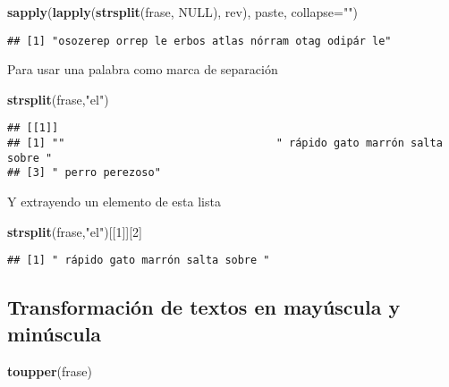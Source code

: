 \documentclass[]{article}
\newenvironment{Shaded}{\begin{snugshade}}{\end{snugshade}}
\newcommand{\KeywordTok}[1]{\textcolor[rgb]{0.13,0.29,0.53}{\textbf{#1}}}
\newcommand{\DataTypeTok}[1]{\textcolor[rgb]{0.13,0.29,0.53}{#1}}
\newcommand{\DecValTok}[1]{\textcolor[rgb]{0.00,0.00,0.81}{#1}}
\newcommand{\StringTok}[1]{\textcolor[rgb]{0.31,0.60,0.02}{#1}}
\newcommand{\OtherTok}[1]{\textcolor[rgb]{0.56,0.35,0.01}{#1}}
\newcommand{\NormalTok}[1]{#1}
\begin{document}
\begin{Shaded}
\begin{Highlighting}[]
\KeywordTok{sapply}\NormalTok{(}\KeywordTok{lapply}\NormalTok{(}\KeywordTok{strsplit}\NormalTok{(frase, }\OtherTok{NULL}\NormalTok{), rev), paste, }\DataTypeTok{collapse=}\StringTok{""}\NormalTok{)}
\end{Highlighting}
\end{Shaded}

\begin{verbatim}
## [1] "osozerep orrep le erbos atlas nórram otag odipár le"
\end{verbatim}

Para usar una palabra como marca de separación

\begin{Shaded}
\begin{Highlighting}[]
\KeywordTok{strsplit}\NormalTok{(frase,}\StringTok{"el"}\NormalTok{)}
\end{Highlighting}
\end{Shaded}

\begin{verbatim}
## [[1]]
## [1] ""                                 " rápido gato marrón salta sobre "
## [3] " perro perezoso"
\end{verbatim}

Y extrayendo un elemento de esta lista

\begin{Shaded}
\begin{Highlighting}[]
\KeywordTok{strsplit}\NormalTok{(frase,}\StringTok{"el"}\NormalTok{)[[}\DecValTok{1}\NormalTok{]][}\DecValTok{2}\NormalTok{]}
\end{Highlighting}
\end{Shaded}

\begin{verbatim}
## [1] " rápido gato marrón salta sobre "
\end{verbatim}

\subsection{Transformación de textos en mayúscula y
minúscula}\label{transformaciuxf3n-de-textos-en-mayuxfascula-y-minuxfascula}

\begin{Shaded}
\begin{Highlighting}[]
\KeywordTok{toupper}\NormalTok{(frase)}
\end{Highlighting}
\end{Shaded}
\end{document}
